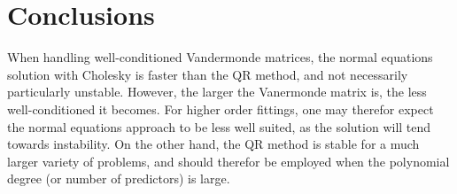 \documentclass[%
oneside,                 %
final,                   %
10pt]{article}
\begin{document}
\section{Conclusions}
When handling well-conditioned Vandermonde matrices, the normal equations solution with Cholesky is faster than the QR method, and not necessarily particularly unstable. However, the larger the Vanermonde matrix is, the less well-conditioned it becomes. For higher order fittings, one may therefor expect the normal equations approach to be less well suited, as the solution will tend towards instability. On the other hand, the QR method is stable for a much larger variety of problems, and should therefor be employed when the polynomial degree (or number of predictors) is large. 




\end{document}
